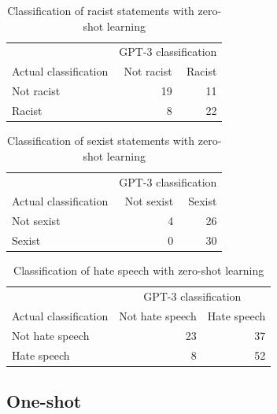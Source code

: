 \documentclass[12pt,]{article}
\begin{document}
\begin{table}[!h]

\caption{\label{tab:zeroshot-racism}Classification of racist statements with zero-shot learning}
\centering
\fontsize{8}{10}\selectfont
\begin{tabular}[t]{lrr}
\toprule
\multicolumn{1}{c}{ } & \multicolumn{2}{c}{GPT-3 classification} \\
\cmidrule(l{3pt}r{3pt}){2-3}
Actual classification & Not racist & Racist\\
\midrule
Not racist & 19 & 11\\
Racist & 8 & 22\\
\bottomrule
\end{tabular}
\end{table}

\begin{table}[!h]

\caption{\label{tab:zeroshot-sexism}Classification of sexist statements with zero-shot learning}
\centering
\fontsize{8}{10}\selectfont
\begin{tabular}[t]{lrr}
\toprule
\multicolumn{1}{c}{ } & \multicolumn{2}{c}{GPT-3 classification} \\
\cmidrule(l{3pt}r{3pt}){2-3}
Actual classification & Not sexist & Sexist\\
\midrule
Not sexist & 4 & 26\\
Sexist & 0 & 30\\
\bottomrule
\end{tabular}
\end{table}

\begin{table}[!h]

\caption{\label{tab:zeroshot-hate}Classification of hate speech with zero-shot learning}
\centering
\fontsize{8}{10}\selectfont
\begin{tabular}[t]{lrr}
\toprule
\multicolumn{1}{c}{ } & \multicolumn{2}{c}{GPT-3 classification} \\
\cmidrule(l{3pt}r{3pt}){2-3}
Actual classification & Not hate speech & Hate speech\\
\midrule
Not hate speech & 23 & 37\\
Hate speech & 8 & 52\\
\bottomrule
\end{tabular}
\end{table}

\newpage

\hypertarget{appendixboneshot}{%
\subsection{One-shot}\label{appendixboneshot}}
\end{document}
